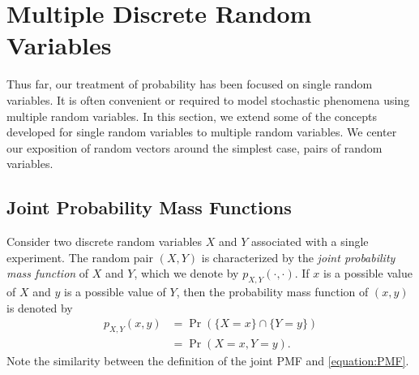 \chapter{Multiple Discrete Random Variables}
\label{chapter:RandomVectorsDiscrete}

Thus far, our treatment of probability has been focused on single random variables.
It is often convenient or required to model stochastic phenomena using multiple random variables.
In this section, we extend some of the concepts developed for single random variables to multiple random variables.
We center our exposition of random vectors around the simplest case, pairs of random variables.


\section{Joint Probability Mass Functions}

Consider two discrete random variables $X$ and $Y$ associated with a single experiment.
The random pair $(X, Y)$ is characterized by the \emph{joint probability mass function} of $X$ and $Y$, which we denote by $p_{X,Y}(\cdot,\cdot)$. 
If $x$ is a possible value of $X$ and $y$ is a possible value of $Y$, then the probability mass function of $(x, y)$ is denoted by
\begin{equation*}
\begin{split}
p_{X,Y} (x, y) &= \Pr ( \{ X = x \} \cap \{ Y = y \} ) \\
&= \Pr ( X = x, Y = y ).
\end{split}
\end{equation*}
Note the similarity between the definition of the joint PMF and \eqref{equation:PMF}.

